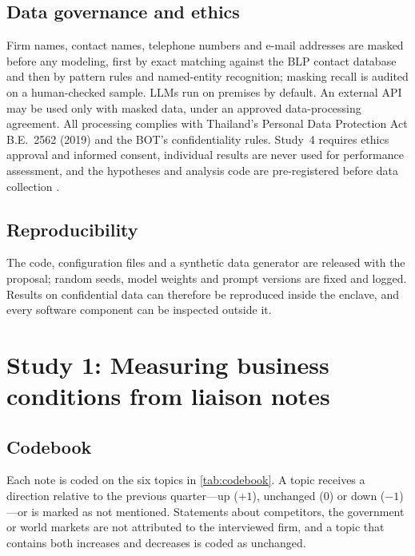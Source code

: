 \documentclass[11pt]{article}
\begin{document}
\subsection{Data governance and ethics}
Firm names, contact names, telephone numbers and e-mail addresses are masked before any modeling, first by exact matching against the BLP contact database and then by pattern rules and named-entity recognition; masking recall is audited on a human-checked sample. LLMs run on premises by default. An external API may be used only with masked data, under an approved data-processing agreement. All processing complies with Thailand's Personal Data Protection Act B.E.~2562 (2019) and the BOT's confidentiality rules. Study~4 requires ethics approval and informed consent, individual results are never used for performance assessment, and the hypotheses and analysis code are pre-registered before data collection \citep{nosek2018preregistration}.

\subsection{Reproducibility}
The code, configuration files and a synthetic data generator are released with the proposal; random seeds, model weights and prompt versions are fixed and logged. Results on confidential data can therefore be reproduced inside the enclave, and every software component can be inspected outside it.

\section{Study 1: Measuring business conditions from liaison notes}\label{sec:study1}

\subsection{Codebook}
Each note is coded on the six topics in \cref{tab:codebook}. A topic receives a direction relative to the previous quarter---up ($+1$), unchanged ($0$) or down ($-1$)---or is marked as not mentioned. Statements about competitors, the government or world markets are not attributed to the interviewed firm, and a topic that contains both increases and decreases is coded as unchanged.
\end{document}
